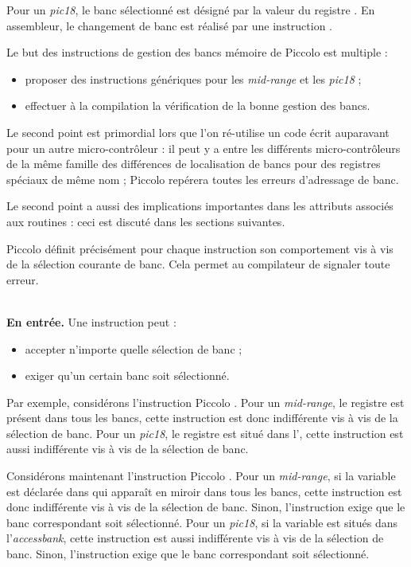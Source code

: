 Pour un \emph{pic18}, le banc sélectionné est désigné par la valeur du registre . En assembleur, le changement de banc est réalisé par une instruction .

Le but des instructions de gestion des bancs mémoire de Piccolo est multiple :
\begin{itemize}
  \item proposer des instructions génériques pour les \emph{mid-range} et les \emph{pic18} ;
  \item effectuer à la compilation la vérification de la bonne gestion des bancs.
\end{itemize}

Le second point est primordial lors que l'on ré-utilise un code écrit auparavant pour un autre micro-contrôleur : il peut y a entre les différents micro-contrôleurs de la même famille des différences de localisation de bancs pour des registres spéciaux de même nom ; Piccolo repérera toutes les erreurs d'adressage de banc.

Le second point a aussi des implications importantes dans les attributs associés aux routines : ceci est discuté dans les sections suivantes.









Piccolo définit précisément pour chaque instruction son comportement vis à vis de la sélection courante de banc. Cela permet au compilateur de signaler toute erreur.

~\\
\textbf{En entrée.} Une instruction peut :
\begin{itemize}
  \item accepter n'importe quelle sélection de banc ;
  \item exiger qu'un certain banc soit sélectionné.
\end{itemize}

Par exemple, considérons l'instruction Piccolo . Pour un \emph{mid-range}, le registre  est présent dans tous les bancs, cette instruction est donc indifférente vis à vis de la sélection de banc. Pour un \emph{pic18}, le registre  est situé dans l', cette instruction est aussi indifférente vis à vis de la sélection de banc. 

Considérons maintenant l'instruction Piccolo . Pour un \emph{mid-range}, si la variable  est déclarée dans  qui apparaît en miroir dans tous les bancs, cette instruction est donc indifférente vis à vis de la sélection de banc. Sinon, l'instruction exige que le banc correspondant soit sélectionné. Pour un \emph{pic18}, si la variable  est situés dans l'\emph{accessbank}, cette instruction est aussi indifférente vis à vis de la sélection de banc.  Sinon, l'instruction exige que le banc correspondant soit sélectionné. 


